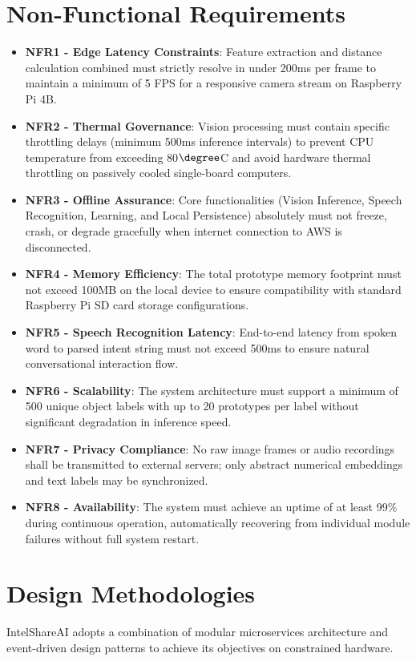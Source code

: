 \documentclass[12pt,a4paper]{report}
\begin{document}
\section{Non-Functional Requirements}
\begin{itemize}
    \item \textbf{NFR1 - Edge Latency Constraints}: Feature extraction and distance calculation combined must strictly resolve in under 200ms per frame to maintain a minimum of 5 FPS for a responsive camera stream on Raspberry Pi 4B.
    \item \textbf{NFR2 - Thermal Governance}: Vision processing must contain specific throttling delays (minimum 500ms inference intervals) to prevent CPU temperature from exceeding 80$\degree$C and avoid hardware thermal throttling on passively cooled single-board computers.
    \item \textbf{NFR3 - Offline Assurance}: Core functionalities (Vision Inference, Speech Recognition, Learning, and Local Persistence) absolutely must not freeze, crash, or degrade gracefully when internet connection to AWS is disconnected.
    \item \textbf{NFR4 - Memory Efficiency}: The total prototype memory footprint must not exceed 100MB on the local device to ensure compatibility with standard Raspberry Pi SD card storage configurations.
    \item \textbf{NFR5 - Speech Recognition Latency}: End-to-end latency from spoken word to parsed intent string must not exceed 500ms to ensure natural conversational interaction flow.
    \item \textbf{NFR6 - Scalability}: The system architecture must support a minimum of 500 unique object labels with up to 20 prototypes per label without significant degradation in inference speed.
    \item \textbf{NFR7 - Privacy Compliance}: No raw image frames or audio recordings shall be transmitted to external servers; only abstract numerical embeddings and text labels may be synchronized.
    \item \textbf{NFR8 - Availability}: The system must achieve an uptime of at least 99\% during continuous operation, automatically recovering from individual module failures without full system restart.
\end{itemize}

\section{Design Methodologies}
IntelShareAI adopts a combination of modular microservices architecture and event-driven design patterns to achieve its objectives on constrained hardware.
\end{document}
